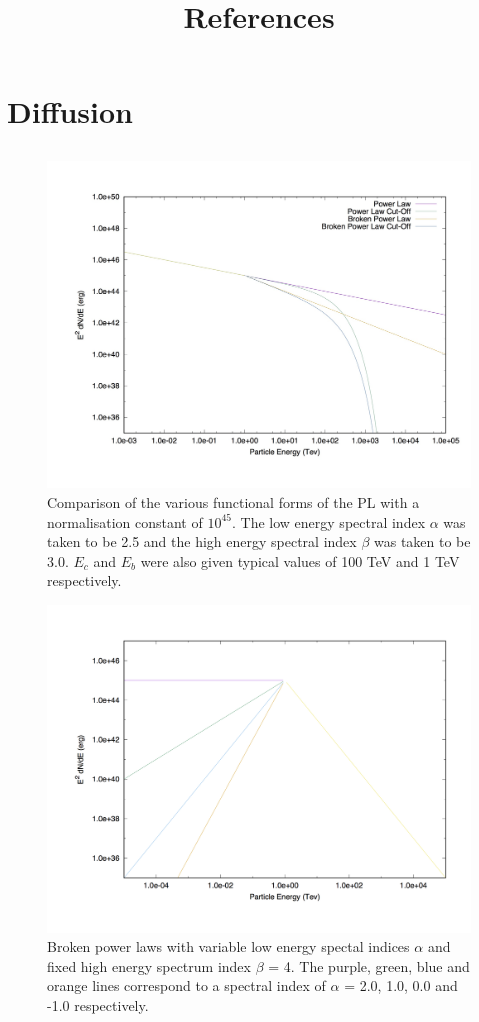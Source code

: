 \documentclass[12pt,a4paper]{article}
\begin{document}
\pagebreak


\newpage

\section{Diffusion}


\clearpage

\title{\LARGE \textbf{References}}

\newpage
\begin{appendices}
	\section{}
	\begin{figure}[H]
		\centering
		\includegraphics[width=0.55\linewidth, height=0.4\textheight, angle=-90]{powerlaws}
		\caption[]{Comparison of the various functional forms of the PL with a normalisation constant of $10^{45}$. The low energy spectral index $\alpha$ was taken to be 2.5 and the high energy spectral index $\beta$ was taken to be 3.0. $E_c$ and $E_b$ were also given typical values of 100 TeV and 1 TeV respectively.}
		\label{fig:powerlaws}
	\end{figure}
	\begin{figure}[H]
		\centering
		\includegraphics[width=0.55\linewidth, height=0.4\textheight, angle=-90]{powerlawsbroken}
		\caption{Broken power laws with variable low energy spectal indices $\alpha$ and fixed high energy spectrum index $\beta$ = 4. The purple, green, blue and orange lines correspond to a spectral index of $\alpha$ = 2.0, 1.0, 0.0 and -1.0 respectively.}

\end{figure}
\end{appendices}
\end{document}
